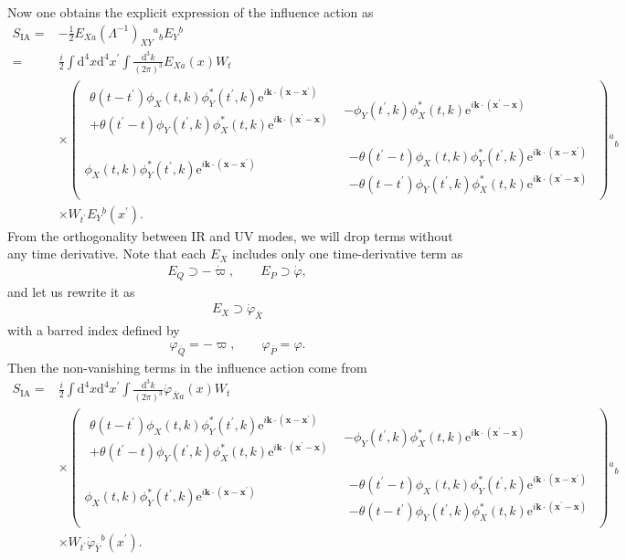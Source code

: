 \documentclass[aps, prd
, preprint
, nofootinbib 
]{revtex4-1}
\newcommand{\dd}{\mathrm{d}}
\newcommand{\ee}{\mathrm{e}}
\newcommand{\dk}{\frac{\dd^3k}{(2\pi)^3}}
\newcommand{\SIA}{S_\text{IA}}
\newcommand{\bae}[1]{\begin{align} #1 \end{align}}
\newcommand{\bpme}[1]{\begin{pmatrix} #1 \end{pmatrix}}
\begin{document}
Now one obtains the explicit expression of the influence action as
\bae{
	\SIA=&-\frac{1}{2}E_{Xa}(\Lambda^{-1})_{XY}{}^a{}_bE_Y{}^b \nonumber \\
	=&\frac{i}{2}\int\dd^4x\dd^4x^\prime\int\dk E_{Xa}(x)W_t \nonumber \\
	&\times\bpme{
		\begin{array}{c}
			\theta(t-t^\prime)\phi_X(t,k)\phi^*_Y(t^\prime,k)\ee^{i\mathbf{k}\cdot(\mathbf{x}-\mathbf{x}^\prime)} \\
			+\theta(t^\prime-t)\phi_Y(t^\prime,k)\phi^*_X(t,k)\ee^{i\mathbf{k}\cdot(\mathbf{x}^\prime-\mathbf{x})}
		\end{array} &
		-\phi_Y(t^\prime,k)\phi^*_X(t,k)\ee^{i\mathbf{k}\cdot(\mathbf{x}^\prime-\mathbf{x})} \\
		\phi_X(t,k)\phi^*_Y(t^\prime,k)\ee^{i\mathbf{k}\cdot(\mathbf{x}-\mathbf{x}^\prime)} &
		\begin{array}{c}
			-\theta(t^\prime-t)\phi_X(t,k)\phi^*_Y(t^\prime,k)\ee^{i\mathbf{k}\cdot(\mathbf{x}-\mathbf{x}^\prime)} \\
			-\theta(t-t^\prime)\phi_Y(t^\prime,k)\phi^*_X(t,k)\ee^{i\mathbf{k}\cdot(\mathbf{x}^\prime-\mathbf{x})}
		\end{array}
	}{}^a{}_b \nonumber \\
	&\times W_{t^\prime}E_Y{}^b(x^\prime).
}
From the orthogonality between IR and UV modes, we will drop terms without any time derivative. Note that each $E_X$ includes only one
time-derivative term as
\bae{
	E_Q\supset-\dot{\varpi}, \quad\quad E_P\supset\dot{\varphi},
}
and let us rewrite it as
\bae{
	E_X\supset\dot{\varphi}_{\bar{X}}
}
with a barred index defined by
\bae{
	\varphi_{\bar{Q}}=-\varpi, \quad\quad \varphi_{\bar{P}}=\varphi.
}
Then the non-vanishing terms in the influence action come from
\bae{
	\SIA=&\frac{i}{2}\int\dd^4x\dd^4x^\prime\int\dk\dot{\varphi}_{\bar{X}a}(x)W_t \nonumber \\
	&\times\bpme{
		\begin{array}{c}
			\theta(t-t^\prime)\phi_X(t,k)\phi^*_Y(t^\prime,k)\ee^{i\mathbf{k}\cdot(\mathbf{x}-\mathbf{x}^\prime)} \\
			+\theta(t^\prime-t)\phi_Y(t^\prime,k)\phi^*_X(t,k)\ee^{i\mathbf{k}\cdot(\mathbf{x}^\prime-\mathbf{x})}
		\end{array} &
		-\phi_Y(t^\prime,k)\phi^*_X(t,k)\ee^{i\mathbf{k}\cdot(\mathbf{x}^\prime-\mathbf{x})} \\
		\phi_X(t,k)\phi^*_Y(t^\prime,k)\ee^{i\mathbf{k}\cdot(\mathbf{x}-\mathbf{x}^\prime)} &
		\begin{array}{c}
			-\theta(t^\prime-t)\phi_X(t,k)\phi^*_Y(t^\prime,k)\ee^{i\mathbf{k}\cdot(\mathbf{x}-\mathbf{x}^\prime)} \\
			-\theta(t-t^\prime)\phi_Y(t^\prime,k)\phi^*_X(t,k)\ee^{i\mathbf{k}\cdot(\mathbf{x}^\prime-\mathbf{x})}
		\end{array}
	}{}^a{}_b \nonumber \\
	&\times W_{t^\prime}\dot{\varphi}_{\bar{Y}}{}^b(x^\prime).
}
\end{document}
